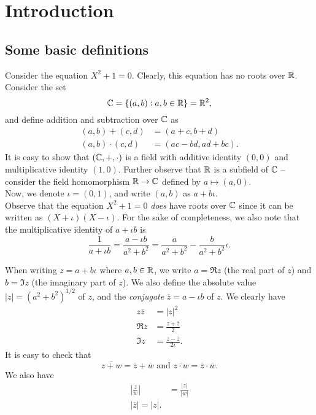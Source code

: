 \section{Introduction}


\subsection{Some basic definitions}

	Consider the equation $X^2 + 1 = 0$. Clearly, this equation has no roots over $\mathbb{R}$. Consider the set
	\[ \mathbb{C} = \{ (a,b) : a,b\in\mathbb{R} \} = \mathbb{R}^2, \]
	and define addition and subtraction over $\mathbb{C}$ as
	\begin{align*}
		(a,b) + (c,d) &= (a+c,b+d) \\
		(a,b) \cdot (c,d) &= (ac-bd,ad+bc).
	\end{align*}
	It is easy to show that $(\mathbb{C},+,\cdot)$ is a field with additive identity $(0,0)$ and multiplicative identity $(1,0)$. Further observe that $\mathbb{R}$ is a subfield of $\mathbb{C}$ -- consider the field homomorphism $\mathbb{R} \to \mathbb{C}$ defined by $a \mapsto (a,0)$.\\
	Now, we denote $\iota = (0,1)$, and write $(a,b)$ as $a+b\iota$.\\

	Observe that the equation $X^2 + 1 = 0$ \emph{does} have roots over $\mathbb{C}$ since it can be written as $(X+\iota)(X-\iota)$. For the sake of completeness, we also note that the multiplicative identity of $a+\iota b$ is
	\[ \frac{1}{a+\iota b} = \frac{a - \iota b}{a^2 + b^2} = \frac{a}{a^2+b^2} - \frac{b}{a^2+b^2}\iota. \]

	When writing $z = a + b\iota$ where $a,b\in\mathbb{R}$, we write $a = \Re z$ (the real part of $z$) and $b = \Im z$ (the imaginary part of $z$). We also define the absolute value $|z| = (a^2 + b^2)^{1/2}$ of $z$, and the \emph{conjugate} $\overline{z} = a - \iota b$ of $z$. We clearly have
	\begin{align*}
		z\overline{z} &= |z|^2 \\
		\Re z &= \frac{z+\overline{z}}{2} \\
		\Im z &= \frac{z-\overline{z}}{2\iota}.
	\end{align*}
	It is easy to check that
	\[ \overline{z+w} = \overline{z} + \overline{w} \text{ and } \overline{z\cdot w} = \overline{z}\cdot \overline{w}. \]
	We also have
	\begin{align*}
		\left| \frac{z}{w} \right| &= \frac{|z|}{|w|} \\
		|\overline{z}| = |z|.
	\end{align*}

